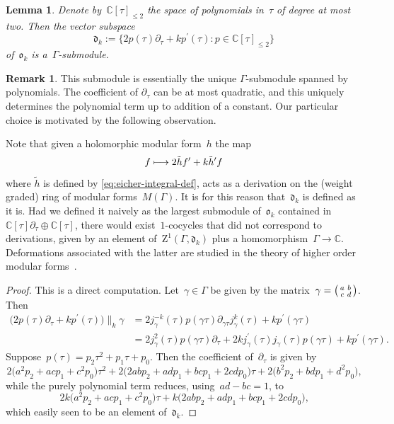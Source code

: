 \documentclass[JEP,XML,SOM,Unicode,published]{cedram}
\newcommand\mto{\mathchoice{\longmapsto}{\mapsto}{\mapsto}{\mapsto}}
\theoremstyle{plain}
\newtheorem{lemma}[theoremcounter]{Lemma}
\theoremstyle{definition}
\newtheorem{remark}[theoremcounter]{Remark}
\newcommand{\tx}{\text}
\newcommand{\nbd}{\nobreakdash-\hspace{0pt}}
\newcommand{\bbC}{\ensuremath{\mathbb{C}}}
\newcommand{\frakd}{\ensuremath{\mathfrak{d}}}
\newcommand{\frako}{\ensuremath{\mathfrak{o}}}
\newcommand{\rmZ}{\ensuremath{\mathrm{Z}}}
\newcommand{\defeq}{:=}
\newcommand{\condcol}{\mathrel{:}}
\newenvironment{psmatrix}{\bigl(\begin{smallmatrix}}{\end{smallmatrix}\bigr)}
\let\Ga\Gamma
\let\ga\gamma
\begin{document}
\begin{lemma}
\label{lem:algebraic-submodule}
Denote by~$\bbC[\tau]_{\leq 2}$ the space of polynomials in~$\tau$ of degree at most two. Then the vector subspace
\begin{equation}
\frakd_k
\defeq
\big\{ 2p(\tau)\partial_\tau + kp^\prime(\tau) \condcol p\in\bbC[\tau]_{\leq 2} \big\}
\end{equation}
of\/~$\frako_k$ is a~$\Ga$\nbd{}submodule.
\end{lemma}

\begin{remark}
This submodule is essentially the unique $\Ga$\nbd{}submodule spanned by polynomials. The coefficient of $\partial_\tau$ can be at most quadratic, and this uniquely determines the polynomial term up to addition of a constant. Our particular choice is motivated by the following observation.

Note that given a holomorphic modular form~$h$ the map
\begin{equation*}
f \mto 2\tilde{h}f^\prime + k \tilde{h}^\prime f
\end{equation*}
where $\tilde{h}$ is defined by \ref{eq:eicher-integral-def}, acts as a derivation on the (weight graded) ring of modular forms~$M(\Ga)$. It is for this reason that~$\frakd_k$ is defined as it is. Had we defined it naively as the largest submodule of~$\frako_k$ contained in~$\bbC[\tau]\partial_\tau\oplus\bbC[\tau]$, there would exist~$1$-cocycles that did not correspond to derivations, given by an element of~$\rmZ^1(\Ga,\frakd_k)$ plus a homomorphism~$\Ga\to\bbC$. Deformations associated with the latter are studied in the theory of higher order modular forms~\cite{goldfeld-2002,chinta-diamantis-osullivan-2002}.
\end{remark}

\begin{proof}
This is a direct computation. Let~$\ga\in\Ga$ be given by the matrix~$\ga = \begin{psmatrix} a & b \\ c& d \end{psmatrix}$. Then
\begin{align*}
\bigl(2p(\tau)\partial_\tau + kp^\prime(\tau) \bigr)\big\|_k\ga
&=
2j_\ga^{-k}(\tau)p(\ga\tau)\partial_{\ga\tau}j_\ga^k(\tau) + k p^\prime(\ga\tau)
\\
&=
2j_\ga^2(\tau)p(\ga\tau)\partial_\tau + 2kj_\ga^\prime(\tau)j_\ga(\tau)p(\ga\tau)+kp^\prime(\ga\tau)
\tx{.}
\end{align*}
Suppose~$p(\tau)=p_2\tau^2 + p_1\tau+ p_0$. Then the coefficient of~$\partial_\tau$ is given by
\begin{equation*}
2 \bigl(a^2 p_2+ac p_1+c^2 p_0\bigr)\tau^2 + 2\bigl(2ab p_2 + ad p_1 + bc p_1 + 2cd p_0\bigr)\tau + 2\bigl(b^2 p_2 + bd p_1 + d^2 p_0\bigr)
\tx{,}
\end{equation*}
while the purely polynomial term reduces, using~$ad-bc=1$, to
\begin{equation*}
2k \bigl(a^2 p_2 + ac p_1 + c^2 p_0 \bigr)\tau + k\bigl(2ab p_2 + ad p_1 + bc p_1 + 2cd p_0 \bigr)
\tx{,}
\end{equation*}
which easily seen to be an element of~$\frakd_k$.
\end{proof}
\end{document}
